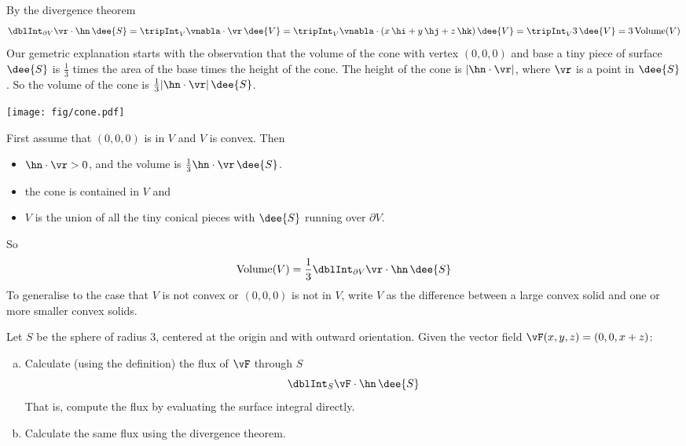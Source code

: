 \begin{solution} 
 By the divergence theorem
\begin{equation*}
\dblInt_{\partial V}\vr\cdot\hn\, \dee{S}
=\tripInt_V\vnabla\cdot\vr\,\dee{V}
=\tripInt_V\vnabla\cdot(x\,\hi+y\,\hj+z\,\hk)\,\dee{V}
=\tripInt_V 3\,\dee{V}
=3\,\text{Volume}(V)
\end{equation*}
Our gemetric explanation starts with the observation that
the volume of the cone with vertex $(0,0,0)$ and base a tiny piece of 
surface $\dee{S}$ is $\frac{1}{3}$ times the area of the base times 
the height of the cone. The height of the cone is $|\hn\cdot\vr|$, 
where $\vr$ is a point in $\dee{S}$. So the volume of the cone is $\frac{1}{3}|\hn\cdot\vr|\,\dee{S}$. 
\begin{center}
       \texttt{[image: fig/cone.pdf]}
\end{center}
First assume that $(0,0,0)$ is in $V$ and $V$ is convex.
Then 
\begin{itemize}\itemsep1pt \parskip0pt  %
\item
$\hn\cdot\vr>0$, and the volume is  $\frac{1}{3} \hn\cdot\vr \,\dee{S}$. 
\item 
the cone is contained in $V$ and
\item
 $V$ is the union of all the tiny conical pieces
with $\dee{S}$ running over $\partial V$.
\end{itemize}
So
\begin{equation*}
\text{Volume}(V)=\frac{1}{3}\dblInt_{\partial V}\vr\cdot\hn\, \dee{S}
\end{equation*}
To generalise to the case that  $V$ is not convex or $(0,0,0)$ is not in $V$,
write $V$ as the difference between a large convex solid and one or more
smaller convex solids. 

\end{solution}

\begin{question}[M317 2016A] %
Let $S$ be the sphere of radius $3$, centered at the origin and 
with outward orientation. Given the vector field $\vF(x,y,z) = (0, 0, x + z)$:
\begin{enumerate}[(a)]
\item
Calculate (using the definition) the flux of $\vF$ through $S$
\begin{equation*}
   \dblInt_S \vF \cdot \hn\,\dee{S}
\end{equation*}
That is, compute the flux by evaluating the surface integral directly.

\item
   Calculate the same flux using the divergence theorem.
\end{enumerate}
\end{question}

